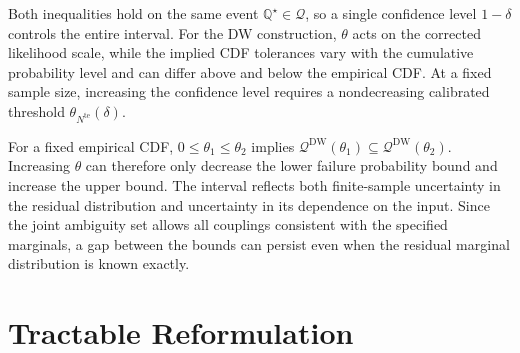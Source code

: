 \documentclass[review,11pt,3p,authoryear,nopreprintline]{elsarticle}
\begin{document}
Both inequalities hold on the same event $\mathbb Q^\star\in\mathscr Q$, so a single confidence level $1-\delta$ controls the entire interval. For the DW construction, $\theta$ acts on the corrected likelihood scale, while the implied CDF tolerances vary with the cumulative probability level and can differ above and below the empirical CDF. At a fixed sample size, increasing the confidence level requires a nondecreasing calibrated threshold $\theta_{N^{\mathrm{te}}}(\delta)$.

For a fixed empirical CDF, $0\le\theta_1\le\theta_2$ implies $\mathscr Q^{\mathrm{DW}}(\theta_1)\subseteq\mathscr Q^{\mathrm{DW}}(\theta_2)$. Increasing $\theta$ can therefore only decrease the lower failure probability bound and increase the upper bound. The interval reflects both finite-sample uncertainty in the residual distribution and uncertainty in its dependence on the input. Since the joint ambiguity set allows all couplings consistent with the specified marginals, a gap between the bounds can persist even when the residual marginal distribution is known exactly.

\section{Tractable Reformulation}
\label{sec-reformulation}



\end{document}
